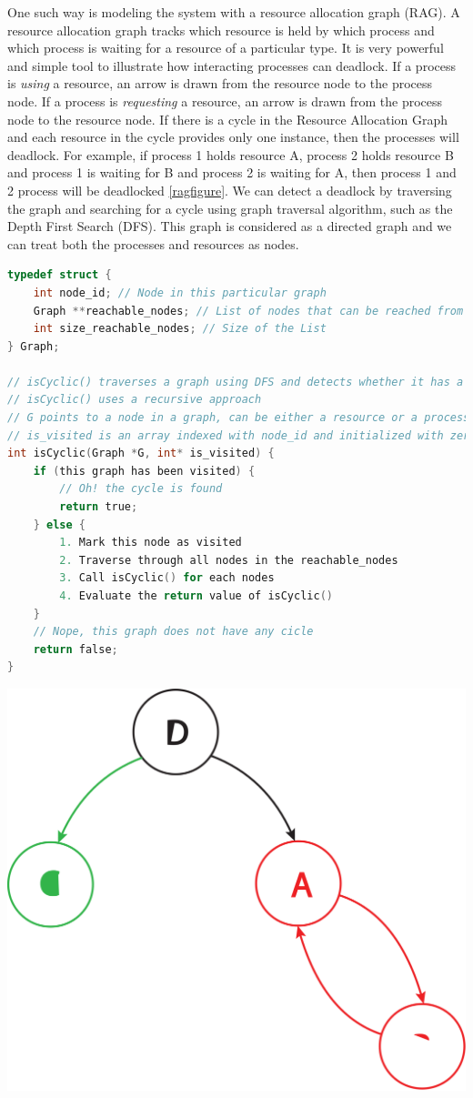 One such way is modeling the system with a resource allocation graph (\gls{RAG}). A resource allocation graph tracks which resource is held by which process and which process is waiting for a resource of a particular type. It is very powerful and simple tool to illustrate how interacting processes can deadlock. If a process is \emph{using} a resource, an arrow is drawn from the resource node to the process node. If a process is \emph{requesting} a resource, an arrow is drawn from the process node to the resource node. If there is a cycle in the Resource Allocation Graph and each resource in the cycle provides only one instance, then the processes will deadlock. For example, if process 1 holds resource A, process 2 holds resource B and process 1 is waiting for B and process 2 is waiting for A, then process 1 and 2 process will be deadlocked \ref{ragfigure}. We can detect a deadlock by traversing the graph and searching for a cycle using graph traversal algorithm, such as the Depth First Search (DFS). This graph is considered as a directed graph and we can treat both the processes and resources as nodes.  

\begin{lstlisting}[language=C]
typedef struct {
	int node_id; // Node in this particular graph 
	Graph **reachable_nodes; // List of nodes that can be reached from this node
	int size_reachable_nodes; // Size of the List
} Graph;

// isCyclic() traverses a graph using DFS and detects whether it has a cycle
// isCyclic() uses a recursive approach
// G points to a node in a graph, can be either a resource or a process
// is_visited is an array indexed with node_id and initialized with zeroes(false) to record whether a particular node has been visited
int isCyclic(Graph *G, int* is_visited) {
	if (this graph has been visited) { 
		// Oh! the cycle is found
		return true;
	} else { 
		1. Mark this node as visited
		2. Traverse through all nodes in the reachable_nodes
		3. Call isCyclic() for each nodes
		4. Evaluate the return value of isCyclic()
	}
	// Nope, this graph does not have any cicle
	return false;
}\end{lstlisting}

\begin{center}
\includegraphics[width=.25\textwidth]{deadlock/images/colorful.png}
  \caption{Graph based Deadlock}
\end{center}

